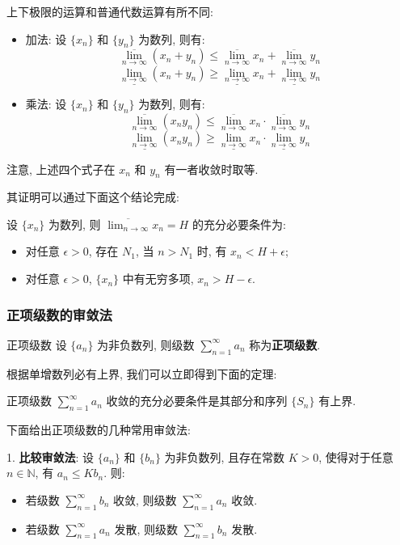 \documentclass[a4paper,12pt]{ctexart}
\begin{document}
上下极限的运算和普通代数运算有所不同:

\begin{itemize}
    \item 加法: 设 $\{x_n\}$ 和 $\{y_n\}$ 为数列, 则有:
$$
\overline{\lim_{n \to \infty}} (x_n + y_n) \leq \overline{\lim_{n \to \infty}} x_n + \overline{\lim_{n \to \infty}} y_n
$$
$$
\underline{\lim_{n \to \infty}} (x_n + y_n) \geq \underline{\lim_{n \to \infty}} x_n + \underline{\lim_{n \to \infty}} y_n
$$
    \item 乘法: 设 $\{x_n\}$ 和 $\{y_n\}$ 为数列, 则有:
$$
\overline{\lim_{n \to \infty}} (x_n y_n) \leq \overline{\lim_{n \to \infty}} x_n \cdot \overline{\lim_{n \to \infty}} y_n
$$
$$
\underline{\lim_{n \to \infty}} (x_n y_n) \geq \underline{\lim_{n \to \infty}} x_n \cdot \underline{\lim_{n \to \infty}} y_n
$$
\end{itemize}
注意, 上述四个式子在 $x_n$ 和 $y_n$ 有一者收敛时取等.

其证明可以通过下面这个结论完成:

\begin{mythm}{}{}
设 $\{x_n\}$ 为数列, 则 $\overline{\lim_{n \to \infty}} x_n = H$ 的充分必要条件为:
\begin{itemize}
    \item 对任意 $\epsilon > 0$, 存在 $N_1$, 当 $n > N_1$ 时, 有 $x_n < H + \epsilon$;
    \item 对任意 $\epsilon > 0$, $\{x_n\}$ 中有无穷多项,  $x_n > H - \epsilon$.
\end{itemize}
\end{mythm}

\subsubsection{正项级数的审敛法}

\begin{mydef}{正项级数}{}
设 $\{a_n\}$ 为非负数列, 则级数 $\sum_{n=1}^{\infty} a_n$ 称为\textbf{正项级数}.
\end{mydef}

根据单增数列必有上界, 我们可以立即得到下面的定理:

\begin{mythm}{}{}
正项级数 $\sum_{n=1}^{\infty} a_n$ 收敛的充分必要条件是其部分和序列 $\{S_n\}$ 有上界.
\end{mythm}

下面给出正项级数的几种常用审敛法:

1. \textbf{比较审敛法}: 设 $\{a_n\}$ 和 $\{b_n\}$ 为非负数列, 且存在常数 $K > 0$, 使得对于任意 $n \in \mathbb{N}$, 有 $a_n \leq K b_n$. 则:
\begin{itemize}
    \item 若级数 $\sum_{n=1}^{\infty} b_n$ 收敛, 则级数 $\sum_{n=1}^{\infty} a_n$ 收敛.
    \item 若级数 $\sum_{n=1}^{\infty} a_n$ 发散, 则级数 $\sum_{n=1}^{\infty} b_n$ 发散.
\end{itemize}
\end{document}
